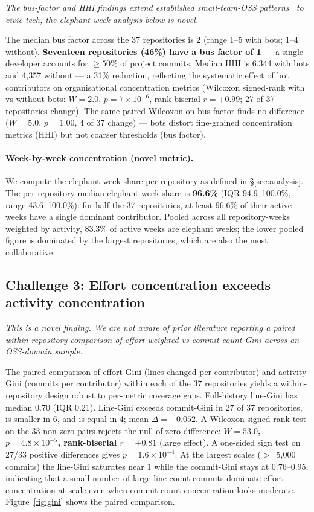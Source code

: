 \documentclass[a4paper,UKenglish,cleveref,autoref,thm-restate]{lipics-v2021}
\begin{document}
\emph{The bus-factor and HHI findings extend established small-team-OSS patterns~\cite{Avelino2016,Goggins2021} to civic-tech; the elephant-week analysis below is novel.}

The median bus factor across the 37 repositories is 2 (range 1--5 with bots; 1--4 without). \textbf{Seventeen repositories (46\%) have a bus factor of 1} --- a single developer accounts for $\geq 50\%$ of project commits. Median HHI is 6{,}344 with bots and 4{,}357 without --- a 31\% reduction, reflecting the systematic effect of bot contributors on organisational concentration metrics (Wilcoxon signed-rank with vs without bots: $W = 2.0$, $p = 7 \times 10^{-6}$, rank-biserial $r = +0.99$; 27 of 37 repositories change). The same paired Wilcoxon on bus factor finds no difference ($W = 5.0$, $p = 1.00$, 4 of 37 change) --- bots distort fine-grained concentration metrics (HHI) but not coarser thresholds (bus factor).

\paragraph{Week-by-week concentration (novel metric).}
We compute the elephant-week share per repository as defined in \S\ref{sec:analysis}. The per-repository median elephant-week share is \textbf{96.6\%} (IQR 94.9--100.0\%, range 43.6--100.0\%): for half the 37 repositories, at least 96.6\% of their active weeks have a single dominant contributor. Pooled across all repository-weeks weighted by activity, 83.3\% of active weeks are elephant weeks; the lower pooled figure is dominated by the largest repositories, which are also the most collaborative.

\subsection{Challenge 3: Effort concentration exceeds activity concentration}\label{sec:gini}

\emph{This is a novel finding. We are not aware of prior literature reporting a paired within-repository comparison of effort-weighted vs commit-count Gini across an OSS-domain sample.}

The paired comparison of effort-Gini (lines changed per contributor) and activity-Gini (commits per contributor) within each of the 37 repositories yields a within-repository design robust to per-metric coverage gaps. Full-history line-Gini has median 0.70 (IQR 0.21). Line-Gini exceeds commit-Gini in 27 of 37 repositories, is smaller in 6, and is equal in 4; mean $\Delta = +0.052$. A Wilcoxon signed-rank test on the 33 non-zero pairs rejects the null of zero difference: \textbf{$W = 53.0$, $p = 4.8 \times 10^{-5}$, rank-biserial $r = +0.81$} (large effect). A one-sided sign test on 27/33 positive differences gives $p = 1.6 \times 10^{-4}$. At the largest scales ($>$~5{,}000 commits) the line-Gini saturates near 1 while the commit-Gini stays at 0.76--0.95, indicating that a small number of large-line-count commits dominate effort concentration at scale even when commit-count concentration looks moderate. Figure~\ref{fig:gini} shows the paired comparison.
\end{document}
